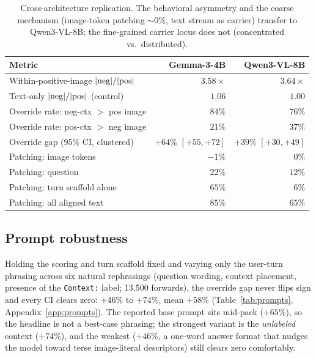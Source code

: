 \documentclass{article}
\newcommand{\gemma}{Gemma-3-4B}
\newcommand{\qwen}{Qwen3-VL-8B}
\begin{document}
\begin{table}[t]
  \caption{Cross-architecture replication. The behavioral asymmetry and the coarse mechanism (image-token patching ${\sim}0\%$, text stream as carrier) transfer to \qwen{}; the fine-grained carrier locus does not (concentrated vs.\ distributed).}
  \label{tab:qwen}
  \centering
  \begin{tabular}{lrr}
    \toprule
    Metric & \gemma{} & \qwen{} \\
    \midrule
    Within-positive-image $|{\rm neg}|/|{\rm pos}|$ & $3.58\times$ & $3.64\times$ \\
    Text-only $|{\rm neg}|/|{\rm pos}|$ (control)   & $1.06$ & $1.00$ \\
    Override rate: neg-ctx $>$ pos image            & $84\%$ & $76\%$ \\
    Override rate: pos-ctx $>$ neg image            & $21\%$ & $37\%$ \\
    Override gap (95\% CI, clustered)               & $+64\%$ $[+55,+72]$ & $+39\%$ $[+30,+49]$ \\
    \midrule
    Patching: image tokens                          & $-1\%$ & $0\%$ \\
    Patching: question                              & $22\%$ & $12\%$ \\
    Patching: turn scaffold alone                   & $65\%$ & $6\%$ \\
    Patching: all aligned text                      & $85\%$ & $65\%$ \\
    \bottomrule
  \end{tabular}
\end{table}

\subsection{Prompt robustness}
\label{sec:prompts}

Holding the scoring and turn scaffold fixed and varying only the user-turn phrasing across six natural rephrasings (question wording, context placement, presence of the \texttt{Context:} label; 13{,}500 forwards), the override gap never flips sign and every CI clears zero: $+46\%$ to $+74\%$, mean $+58\%$ (Table~\ref{tab:prompts}, Appendix~\ref{app:prompts}). The reported base prompt sits mid-pack ($+65\%$), so the headline is not a best-case phrasing; the strongest variant is the \emph{unlabeled} context ($+74\%$), and the weakest ($+46\%$, a one-word answer format that nudges the model toward terse image-literal descriptors) still clears zero comfortably.
\end{document}
